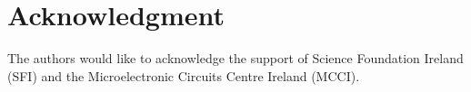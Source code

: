 \section*{Acknowledgment}
The authors would like to acknowledge the support of Science Foundation Ireland (SFI) and the Microelectronic Circuits Centre Ireland (MCCI).
